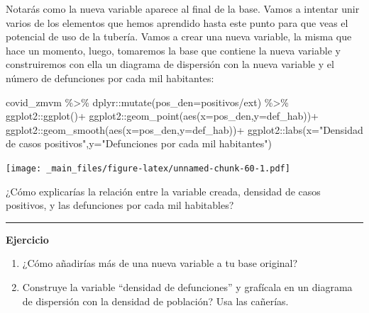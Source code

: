 \documentclass[
  11pt,
  oneside]{book}
\newenvironment{Shaded}{\begin{snugshade}}{\end{snugshade}}
\newcommand{\AttributeTok}[1]{\textcolor[rgb]{0.77,0.63,0.00}{#1}}
\newcommand{\FunctionTok}[1]{\textcolor[rgb]{0.00,0.00,0.00}{#1}}
\newcommand{\NormalTok}[1]{#1}
\newcommand{\SpecialCharTok}[1]{\textcolor[rgb]{0.00,0.00,0.00}{#1}}
\newcommand{\StringTok}[1]{\textcolor[rgb]{0.31,0.60,0.02}{#1}}
\begin{document}
Notarás como la nueva variable aparece al final de la base. Vamos a intentar unir varios de los elementos que hemos aprendido hasta este punto para que veas el potencial de uso de la tubería. Vamos a crear una nueva variable, la misma que hace un momento, luego, tomaremos la base que contiene la nueva variable y construiremos con ella un diagrama de dispersión con la nueva variable y el número de defunciones por cada mil habitantes:

\begin{Shaded}
\begin{Highlighting}[]
\NormalTok{covid\_zmvm }\SpecialCharTok{\%\textgreater{}\%} 
\NormalTok{  dplyr}\SpecialCharTok{::}\FunctionTok{mutate}\NormalTok{(}\AttributeTok{pos\_den=}\NormalTok{positivos}\SpecialCharTok{/}\NormalTok{ext) }\SpecialCharTok{\%\textgreater{}\%} 
\NormalTok{  ggplot2}\SpecialCharTok{::}\FunctionTok{ggplot}\NormalTok{()}\SpecialCharTok{+}
\NormalTok{    ggplot2}\SpecialCharTok{::}\FunctionTok{geom\_point}\NormalTok{(}\FunctionTok{aes}\NormalTok{(}\AttributeTok{x=}\NormalTok{pos\_den,}\AttributeTok{y=}\NormalTok{def\_hab))}\SpecialCharTok{+}
\NormalTok{    ggplot2}\SpecialCharTok{::}\FunctionTok{geom\_smooth}\NormalTok{(}\FunctionTok{aes}\NormalTok{(}\AttributeTok{x=}\NormalTok{pos\_den,}\AttributeTok{y=}\NormalTok{def\_hab))}\SpecialCharTok{+}
\NormalTok{    ggplot2}\SpecialCharTok{::}\FunctionTok{labs}\NormalTok{(}\AttributeTok{x=}\StringTok{"Densidad de casos positivos"}\NormalTok{,}\AttributeTok{y=}\StringTok{"Defunciones por cada mil habitantes"}\NormalTok{)}
\end{Highlighting}
\end{Shaded}

\texttt{[image: \_main\_files/figure-latex/unnamed-chunk-60-1.pdf]}

¿Cómo explicarías la relación entre la variable creada, densidad de casos positivos, y las defunciones por cada mil habitables?

\begin{center}\rule{0.5\linewidth}{0.5pt}\end{center}

\textbf{Ejercicio}

\begin{enumerate}
\def\labelenumi{\roman{enumi}.}
\item
  ¿Cómo añadirías más de una nueva variable a tu base original?
\item
  Construye la variable ``densidad de defunciones'' y grafícala en un diagrama de dispersión con la densidad de población? Usa las cañerías.
\end{enumerate}
\end{document}
